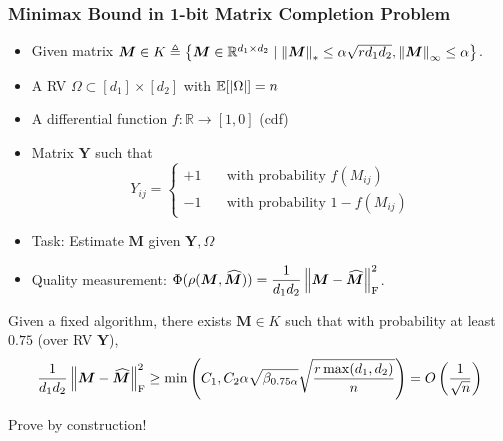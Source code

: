 \documentclass[10pt,xcolor={usenames,dvipsnames,table},aspectratio=169]{beamer}
\begin{document}
\begin{frame}
    \frametitle{Minimax Bound in 1-bit Matrix Completion Problem}
\begin{itemize}
    \item Given matrix $\bm{M} \in K \triangleq \left\{\bm{M}  \in  \mathbb{R}^{d_1 \times d_2} \mid \left\lVert\bm{M}\right\rVert_{*} \leq \alpha \sqrt{r d_1 d_2}, \left\lVert\bm{M}\right\rVert_{\infty} \leq \alpha \right\}$.
    \item A RV $\Omega \subset [d_1] \times [d_2]$ with $ \mathbb{E}[\left\lvert\Omega\right\rvert] = n$
    \item A differential function $f: \mathbb{R} \rightarrow [1,0]$ (cdf)
    \item Matrix $\bm{Y}$ such that
        \[
            Y_{ij} = 
            \begin{cases}
                +1 \quad & \text{with probability } f(M_{ij}) \\
                -1 \quad & \text{with probability } 1-f(M_{ij})
            \end{cases}
        \] 
    \item Task: Estimate $\bm{M}$ given $\bm{Y}, \Omega$ 
    \item Quality measurement: $\Phi(\rho(\bm{M}, \widehat{\bm{M}})) = \dfrac{1}{d_1 d_2} \left\lVert\bm{M} - \widehat{\bm{M}}\right\rVert_{\rm F}^2$.
\end{itemize}

\begin{theorem}
        Given a fixed algorithm, there exists $\bm{M} \in K$ such that with probability at least $0.75$ {\blue (over RV $\bm{Y}$)},
        \[
        \dfrac{1}{d_1 d_2} \left\lVert\bm{M} - \widehat{\bm{M}}\right\rVert_{\rm F}^2 
        \geq  \min \left( C_1, C_2 \alpha \sqrt{\beta_{0.75 \alpha}} \sqrt{\dfrac{r \max(d_1, d_2)}{n}}\right) = O \left(\dfrac{1}{\sqrt{n}}\right)
        \] 
\end{theorem}
Prove by construction!
\end{frame}
\end{document}
